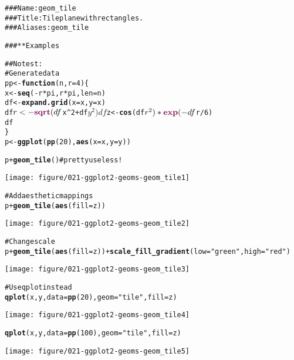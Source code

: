 \documentclass[a4paper,titlepage]{tufte-handout}\usepackage{graphicx, color}
\makeatletter
\def\maxwidth{ %
  \ifdim\Gin@nat@width>\linewidth
    \linewidth
  \else
    \Gin@nat@width
  \fi
}
\newcommand{\hlfunctioncall}[1]{\textcolor[rgb]{0.501960784313725,0,0.329411764705882}{\textbf{#1}}}%
\newcommand{\hlstring}[1]{\textcolor[rgb]{0.6,0.6,1}{#1}}%
\newcommand{\hlcomment}[1]{\textcolor[rgb]{0.180392156862745,0.6,0.341176470588235}{#1}}%
\newenvironment{kframe}{%
 \def\at@end@of@kframe{}%
 \ifinner\ifhmode%
  \def\at@end@of@kframe{\end{minipage}}%
  \begin{minipage}{\columnwidth}%
 \fi\fi%
 \def\FrameCommand##1{\hskip\@totalleftmargin \hskip-\fboxsep
 \colorbox{shadecolor}{##1}\hskip-\fboxsep
     \hskip-\linewidth \hskip-\@totalleftmargin \hskip\columnwidth}%
 \MakeFramed {\advance\hsize-\width
   \@totalleftmargin\z@ \linewidth\hsize
   \@setminipage}}%
 {\par\unskip\endMakeFramed%
 \at@end@of@kframe}
\newenvironment{knitrout}{}{} %
\makeatother
\begin{document}
\begin{knitrout}
\color{fgcolor}\begin{kframe}
\begin{alltt}
\hlcomment{### Name: geom_tile}
\hlcomment{### Title: Tile plane with rectangles.}
\hlcomment{### Aliases: geom_tile}

\hlcomment{### ** Examples}

\hlcomment{## No test: }
\hlcomment{# Generate data}
pp <- \hlfunctioncall{function} (n,r=4) \{
 x <- \hlfunctioncall{seq}(-r*pi, r*pi, len=n)
 df <- \hlfunctioncall{expand.grid}(x=x, y=x)
 df$r <- \hlfunctioncall{sqrt}(df$x^2 + df$y^2)
 df$z <- \hlfunctioncall{cos}(df$r^2)*\hlfunctioncall{exp}(-df$r/6)
 df
\}
p <- \hlfunctioncall{ggplot}(\hlfunctioncall{pp}(20), \hlfunctioncall{aes}(x=x,y=y))

p + \hlfunctioncall{geom_tile}() \hlcomment{#pretty useless!}
\end{alltt}
\end{kframe}
\texttt{[image: figure/021-ggplot2-geoms-geom\_tile1]} 
\begin{kframe}\begin{alltt}

\hlcomment{# Add aesthetic mappings}
p + \hlfunctioncall{geom_tile}(\hlfunctioncall{aes}(fill=z))
\end{alltt}
\end{kframe}
\texttt{[image: figure/021-ggplot2-geoms-geom\_tile2]} 
\begin{kframe}\begin{alltt}

\hlcomment{# Change scale}
p + \hlfunctioncall{geom_tile}(\hlfunctioncall{aes}(fill=z)) + \hlfunctioncall{scale_fill_gradient}(low=\hlstring{"green"}, high=\hlstring{"red"})
\end{alltt}
\end{kframe}
\texttt{[image: figure/021-ggplot2-geoms-geom\_tile3]} 
\begin{kframe}\begin{alltt}

\hlcomment{# Use qplot instead}
\hlfunctioncall{qplot}(x, y, data=\hlfunctioncall{pp}(20), geom=\hlstring{"tile"}, fill=z)
\end{alltt}
\end{kframe}
\texttt{[image: figure/021-ggplot2-geoms-geom\_tile4]} 
\begin{kframe}\begin{alltt}
\hlfunctioncall{qplot}(x, y, data=\hlfunctioncall{pp}(100), geom=\hlstring{"tile"}, fill=z)
\end{alltt}
\end{kframe}
\texttt{[image: figure/021-ggplot2-geoms-geom\_tile5]} 
\begin{kframe}\begin{alltt}


\end{alltt}
\end{kframe}
\end{knitrout}
\end{document}
